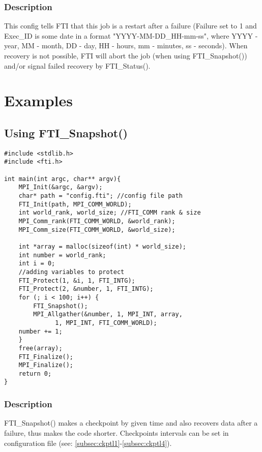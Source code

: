 \documentclass{refrep}
\begin{document}
\subsection*{Description}
This config tells FTI that this job is a restart after a failure (Failure set to 1 and Exec\_ID is some date in a format "YYYY-MM-DD\_HH-mm-ss", where YYYY - year, MM - month, DD - day, HH - hours, mm - minutes, ss - seconds). When recovery is not possible, FTI will abort the job (when using FTI\_Snapshot()) and/or signal failed recovery by FTI\_Status().
\newpage
\chapter{Examples}\label{ch:example}
\section{Using FTI\_Snapshot()}\label{subsec:usingsnapshot}
\begin{center}
\begin{lstlisting}[frame=single]
#include <stdlib.h>
#include <fti.h>

int main(int argc, char** argv){
    MPI_Init(&argc, &argv);
    char* path = "config.fti"; //config file path
    FTI_Init(path, MPI_COMM_WORLD);
    int world_rank, world_size; //FTI_COMM rank & size
    MPI_Comm_rank(FTI_COMM_WORLD, &world_rank);
    MPI_Comm_size(FTI_COMM_WORLD, &world_size);

    int *array = malloc(sizeof(int) * world_size);
    int number = world_rank;
    int i = 0;
    //adding variables to protect
    FTI_Protect(1, &i, 1, FTI_INTG);
    FTI_Protect(2, &number, 1, FTI_INTG);
    for (; i < 100; i++) {
        FTI_Snapshot();
        MPI_Allgather(&number, 1, MPI_INT, array,
		      1, MPI_INT, FTI_COMM_WORLD);
	number += 1;
    }
    free(array);
    FTI_Finalize();
    MPI_Finalize();
    return 0;
}
\end{lstlisting}
\end{center}
\subsection*{Description}
FTI\_Snapshot() makes a checkpoint by given time and also recovers data after a failure, thus makes the code shorter. Checkpoints intervals can be set in configuration file (see: \ref{subsec:ckptl1}-\ref{subsec:ckptl4}).
\newpage
\end{document}
